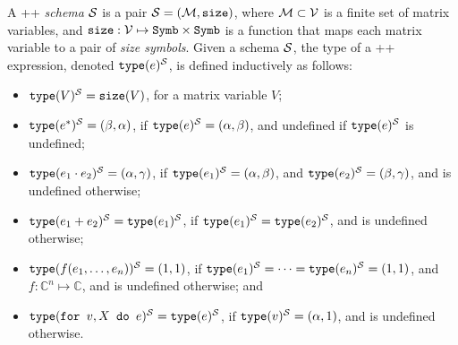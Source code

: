 A \lang++ {\em schema} $\mathcal{S}$ is a pair $\mathcal{S}=(\mathcal{M},\texttt{size})$, where $\mathcal{M}\subset \mathcal{V}$ is a finite set of matrix variables, and $\texttt{size}: \mathcal{V} \mapsto \texttt{Symb}\times \texttt{Symb}$ is a function that maps each matrix variable to a pair of {\em size symbols}. Given a schema $\mathcal{S}$, the type of a \lang++ expression, denoted $\texttt{type}(e)^{\mathcal{S}}$, is defined inductively as follows:
\begin{itemize}
\item $\texttt{type}(V)^{\mathcal{S}} = \texttt{size}(V)$, for a matrix variable $V$;
\item $\texttt{type}(e^*)^{\mathcal{S}} = (\beta,\alpha)$, if $\texttt{type}(e)^{\mathcal{S}}=(\alpha,\beta)$, and undefined if $\texttt{type}(e)^{\mathcal{S}}$ is undefined;
\item $\texttt{type}(e_1 \cdot e_2)^{\mathcal{S}} = (\alpha,\gamma)$, if $\texttt{type}(e_1)^{\mathcal{S}}=(\alpha,\beta)$, and $\texttt{type}(e_2)^{\mathcal{S}}=(\beta,\gamma)$, and is undefined otherwise;
\item $\texttt{type}(e_1 + e_2)^{\mathcal{S}} = \texttt{type}(e_1)^{\mathcal{S}}$, if $\texttt{type}(e_1)^{\mathcal{S}} = \texttt{type}(e_2)^{\mathcal{S}}$, and is undefined otherwise;
\item $\texttt{type}(f(e_1,\ldots ,e_n))^{\mathcal{S}} = (1,1)$, if $\texttt{type}(e_1)^{\mathcal{S}}= \cdots =\texttt{type}(e_n)^{\mathcal{S}}=(1,1)$, and $f:\mathbb{C}^n\mapsto \mathbb{C}$, and is undefined otherwise; and
\item $\texttt{type}(\texttt{for }v,X \texttt{ do }e)^{\mathcal{S}} = \texttt{type}(e)^{\mathcal{S}}$, if $\texttt{type}(v)^{\mathcal{S}} = (\alpha,1)$, and is undefined otherwise.
\end{itemize}

